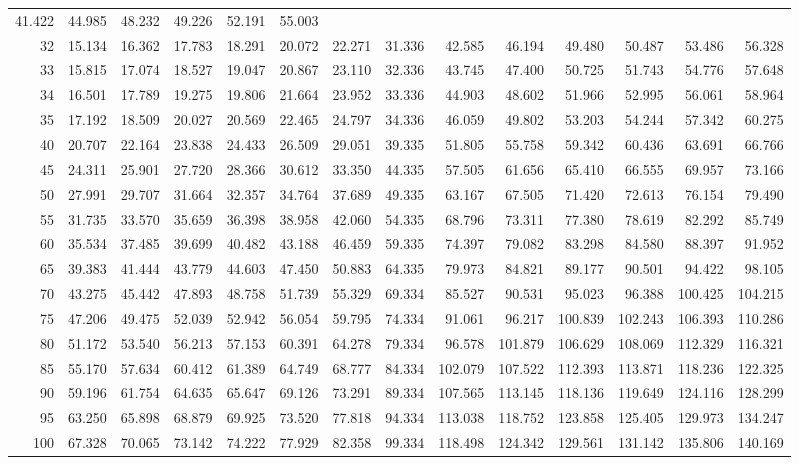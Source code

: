 {\begin{tabular} {r|rrrr|rrrrr|rrrr}
      41.422 & 44.985 & 48.232 & 49.226 & 52.191 & 55.003 \\
 32 & 15.134 & 16.362 & 17.783 & 18.291 & 20.072 & 22.271 & 31.336 & 
      42.585 & 46.194 & 49.480 & 50.487 & 53.486 & 56.328 \\
 33 & 15.815 & 17.074 & 18.527 & 19.047 & 20.867 & 23.110 & 32.336 &
      43.745 & 47.400 & 50.725 & 51.743 & 54.776 & 57.648 \\
 34 & 16.501 & 17.789 & 19.275 & 19.806 & 21.664 & 23.952 & 33.336 &
      44.903 & 48.602 & 51.966 & 52.995 & 56.061 & 58.964 \\
 35 & 17.192 & 18.509 & 20.027 & 20.569 & 22.465 & 24.797 & 34.336 &
      46.059 & 49.802 & 53.203 & 54.244 & 57.342 & 60.275 \\
\hline
 40 & 20.707 & 22.164 & 23.838 & 24.433 & 26.509 & 29.051 & 39.335 & 
      51.805 & 55.758 & 59.342 & 60.436 & 63.691 & 66.766 \\
 45 & 24.311 & 25.901 & 27.720 & 28.366 & 30.612 & 33.350 & 44.335 &
      57.505 & 61.656 & 65.410 & 66.555 & 69.957 & 73.166 \\
 50 & 27.991 & 29.707 & 31.664 & 32.357 & 34.764 & 37.689 & 49.335 &
      63.167 & 67.505 & 71.420 & 72.613 & 76.154 & 79.490 \\
 55 & 31.735 & 33.570 & 35.659 & 36.398 & 38.958 & 42.060 & 54.335 &
      68.796 & 73.311 & 77.380 & 78.619 & 82.292 & 85.749 \\
 60 & 35.534 & 37.485 & 39.699 & 40.482 & 43.188 & 46.459 & 59.335 &
      74.397 & 79.082 & 83.298 & 84.580 & 88.397 & 91.952 \\
\hline
 65 & 39.383 & 41.444 & 43.779 & 44.603 & 47.450 & 50.883 & 64.335 &
      79.973 & 84.821 & 89.177 & 90.501 & 94.422 & 98.105 \\
 70 & 43.275 & 45.442 & 47.893 & 48.758 & 51.739 & 55.329 & 69.334 &
      85.527 & 90.531 & 95.023 & 96.388 & 100.425 & 104.215 \\
 75 & 47.206 & 49.475 & 52.039 & 52.942 & 56.054 & 59.795 & 74.334 &
      91.061 & 96.217 & 100.839 & 102.243 & 106.393 & 110.286 \\
 80 & 51.172 & 53.540 & 56.213 & 57.153 & 60.391 & 64.278 & 79.334 &
      96.578 & 101.879 & 106.629 & 108.069 & 112.329 & 116.321 \\
 85 & 55.170 & 57.634 & 60.412 & 61.389 & 64.749 & 68.777 & 84.334 &
      102.079 & 107.522 & 112.393 & 113.871 & 118.236 & 122.325 \\
\hline
 90 & 59.196 & 61.754 & 64.635 & 65.647 & 69.126 & 73.291 & 89.334 & 
      107.565 & 113.145 & 118.136 & 119.649 & 124.116 & 128.299 \\
 95 & 63.250 & 65.898 & 68.879 & 69.925 & 73.520 & 77.818 & 94.334 &
      113.038 & 118.752 & 123.858 & 125.405 & 129.973 & 134.247 \\
100 & 67.328 & 70.065 & 73.142 & 74.222 & 77.929 & 82.358 & 99.334 &
      118.498 & 124.342 & 129.561 & 131.142 & 135.806 & 140.169 \\
\hline
\end{tabular}
}
